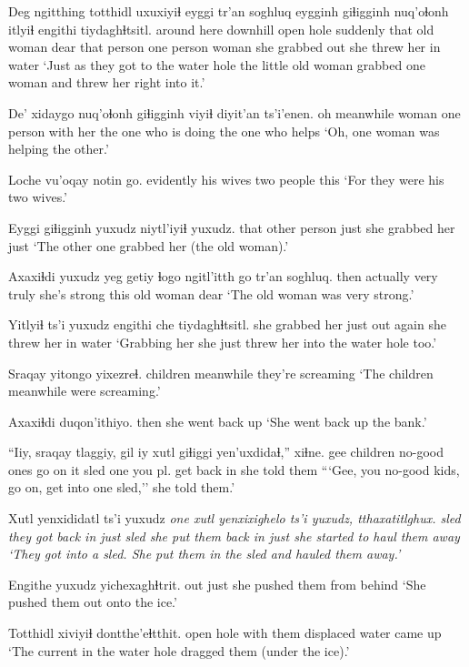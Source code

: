 \documentclass[12pt]{article}
\begin{document}
\gll Deg ngitthing totthidl uxuxiyiɬ eyggi tr'an soghluq eygginh giɬigginh nuq'oɬonh itlyiɬ engithi tiydaghɬtsitl.
{around here} downhill {open hole} suddenly that {old woman} dear {that person} {one person} woman {she grabbed} out {she threw her in water}
\glt `Just as they got to the water hole the little old woman grabbed one woman and threw her right into it.'
\glend

\gll De' xidaygo nuq'oɬonh giɬigginh viyiɬ diyit'an ts'i'enen.
oh meanwhile woman {one person} {with her} {the one who is doing} {the one who helps}
\glt `Oh, one woman was helping the other.'
\glend

\gll Loche vu'oqay notin go.
evidently {his wives} {two people} this
\glt `For they were his two wives.'
\glend

\gll Eyggi giɬigginh yuxudz niytl'iyiɬ yuxudz.
that {other person} just {she grabbed her} just
\glt `The other one grabbed her (the old woman).'
\glend

\gll Axaxiɬdi {yuxudz yeg} getiy ɬogo ngitl'itth go tr'an soghluq.
then actually very truly {she's strong} this {old woman} dear
\glt `The old woman was very strong.'
\glend

\gll Yitlyiɬ ts'i yuxudz engithi che tiydaghɬtsitl.
{she grabbed her} {} just out again {she threw her in water}
\glt `Grabbing her she just threw her into the water hole too.'
\glend

\gll Sraqay yitongo yixezreɬ.
children meanwhile {they're screaming}
\glt `The children meanwhile were screaming.'
\glend

\gll Axaxiɬdi duqon'ithiyo.
then {she went back up}
\glt `She went back up the bank.'
\glend

\gll ``Iiy, sraqay tlaggiy, gil iy xutl giɬiggi yen'uxdidaɬ,'' xiɬne.
gee children {no-good ones} {go on} it sled one {you pl. get back in} {she told them}
\glt ```Gee, you no-good kids, go on, get into one sled,'' she told them.'
\glend

\gll Xutl yenxididatl ts'i yuxudz \em{one} xutl yenxixighelo ts'i yuxudz, tthaxatitlghux.
sled {they got back in} {} just {} sled {she put them back in} {} just {she started to haul them away}
\glt `They got into a sled. She put them in the sled and hauled them away.'
\glend

\gll Engithe yuxudz yichexaghɬtrit.
out just {she pushed them from behind}
\glt `She pushed them out onto the ice.'
\glend

\gll Totthidl xiviyiɬ dontthe'eɬtthit.
{open hole} {with them} {displaced water came up}
\glt `The current in the water hole dragged them (under the ice).'
\glend
\end{document}
